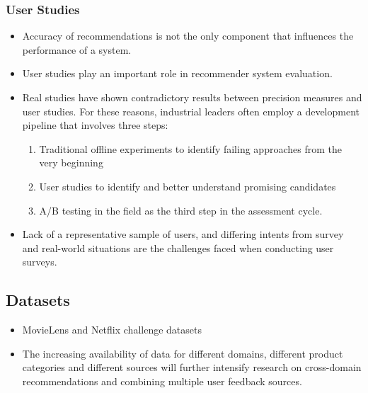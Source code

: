 \documentclass{article}
\begin{document}
\subsubsection{User Studies}
\begin{itemize}

    \item Accuracy of recommendations is not the only component that influences the performance of a system. 
    
    \item User studies play an important role in recommender system evaluation. 
    
    \item Real studies have shown contradictory results between precision measures and user studies.  For these reasons, industrial leaders often employ a development pipeline that involves three steps: 
    \begin{enumerate}
        \item Traditional offline experiments to identify failing approaches from the very beginning
        
        \item User studies to identify and better understand promising candidates
        
        \item A/B testing in the field as the third step in the assessment cycle.
    \end{enumerate} 
    
    \item Lack of a representative sample of users, and differing intents from survey and real-world situations are the challenges faced when conducting user surveys.
\end{itemize}

\subsection{Datasets}
\begin{itemize}
    \item MovieLens and Netflix challenge datasets
    
    \item The increasing availability of data for different domains, different product categories and different sources will further intensify research on cross-domain recommendations and combining multiple user feedback sources. 
\end{itemize}
\end{document}
